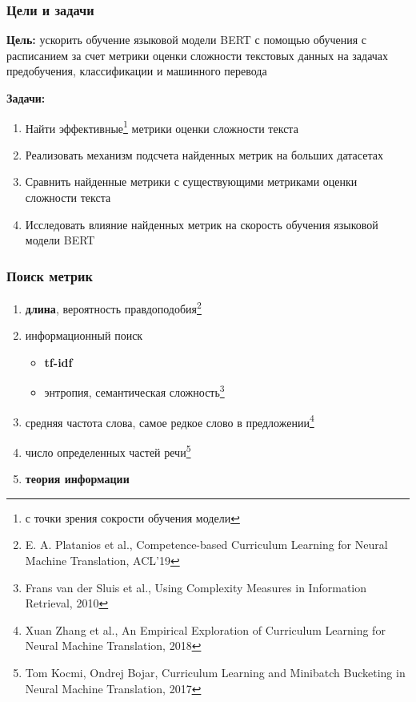 \documentclass{beamer}
\begin{document}
\begin{frame}
	\frametitle{Цели и задачи}
	{\bf Цель:} ускорить обучение языковой модели BERT с помощью обучения с расписанием за счет метрики оценки сложности текстовых данных на задачах предобучения, классификации и машинного перевода

	{\bf Задачи:}
	\begin{enumerate}
		\item Найти эффективные\footnote[1]{с точки зрения сокрости обучения модели} метрики оценки сложности текста
		\item Реализовать механизм подсчета найденных метрик на больших датасетах
		\item Сравнить найденные метрики с существующими метриками оценки сложности текста
		\item Исследовать влияние найденных метрик на скорость обучения языковой модели BERT
	\end{enumerate}
\end{frame}

\begin{frame}
	\frametitle{Поиск метрик}
	\begin{enumerate}
		\item {\bf длина}, вероятность правдоподобия\footnote[1]{E. A. Platanios et al., Competence-based Curriculum Learning for Neural Machine Translation, ACL'19}
		\item информационный поиск
			\begin{itemize}
				\item {\bf tf-idf}
				\item энтропия, семантическая сложность\footnote[2]{Frans van der Sluis et al., Using Complexity Measures in Information Retrieval, 2010}
			\end{itemize}
		\item средняя частота слова, самое редкое слово в предложении\footnote[3]{Xuan Zhang et al., An Empirical Exploration of Curriculum Learning for Neural Machine Translation, 2018}
		\item число определенных частей речи\footnote[4]{Tom Kocmi, Ondrej Bojar, Curriculum Learning and Minibatch Bucketing in Neural Machine Translation, 2017}
		\item {\bf теория информации}
	\end{enumerate}
\end{frame}
\end{document}
